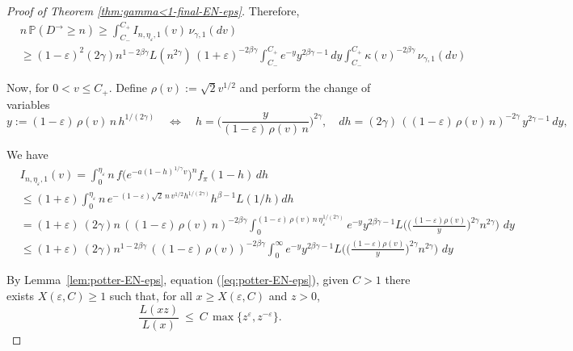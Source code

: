 \documentclass[preprint]{imsart}
\newcommand{\PP}{\mathbb{P}}
\newcommand{\1}{\mathbf{1}}
\theoremstyle{plain}
\theoremstyle{definition}
\begin{document}
\begin{proof}[Proof of Theorem \ref{thm:gamma<1-final-EN-eps}]
Therefore, 
\begin{equation}\label{lim_inf_Dn}
\begin{split}
 &n\,\PP(D^{\rightarrow}\ge n)\ge  \int_{C_{-}}^{C_{+}} I_{n,\eta_{\varepsilon},1}(v)\,\nu_{\gamma,1}(dv) \\ 
 &\geq (1-\varepsilon)^2(2\gamma)n^{1-2\beta\gamma}L(n^{2\gamma})\,(1+\varepsilon)^{-2\beta\gamma}\int_{C_{-}}^{C_{+}} e^{-y}y^{2\beta\gamma-1} \,dy\int_{C_{-}}^{C_{+}}\kappa(v)^{-2\beta\gamma}\,\nu_{\gamma,1}(dv)
\end{split}    
\end{equation}

Now, for \(0<v\leq C_{+}\). Define \(\rho(v):=\sqrt{2}v^{1/2}\) and perform the change of variables
\begin{equation*}
y:=(1-\varepsilon)\,\rho(v)\,n\,h^{1/(2\gamma)}\quad\Longleftrightarrow\quad
h=\Big(\frac{y}{(1-\varepsilon)\,\rho(v)\,n}\Big)^{2\gamma},\quad
dh=(2\gamma)\,((1-\varepsilon)\,\rho(v)\,n)^{-2\gamma}\,y^{2\gamma-1}\,dy,
\end{equation*}

We have
\begin{equation*}
    \begin{split}
        &I_{n,\eta_{\varepsilon},1}(v)=\int_{0}^{\eta_{\varepsilon}} n\, f\!\big(e^{-a(1-h)^{1/\gamma}v}\big)^{n} f_\pi(1-h)\,dh\\
        &\leq (1+\varepsilon)\int_{0}^{\eta_{\varepsilon}} n\, e^{-\,(1-\varepsilon)\sqrt{2}\,n\,v^{1/2} h^{1/(2\gamma)}}h^{\beta-1}L(1/h)dh\\
        &=(1+\varepsilon)\ (2\gamma)n\,((1-\varepsilon)\,\rho(v)\,n)^{-2\beta\gamma}\int_{0}^{(1-\varepsilon)\,\rho(v)\,n\,\eta_{\varepsilon}^{1/(2\gamma)}} e^{-y}y^{2\beta\gamma-1}L\Bigg(\Bigg(\frac{(1-\varepsilon)\rho(v)}{y}\Bigg)^{2\gamma}n^{2\gamma}\Bigg)\, \,dy\\
        &\leq (1+\varepsilon)\ (2\gamma)n^{1-2\beta\gamma}\,((1-\varepsilon)\,\rho(v))^{-2\beta\gamma}\int_{0}^{\infty} e^{-y}y^{2\beta\gamma-1}L\Bigg(\Bigg(\frac{(1-\varepsilon)\rho(v)}{y}\Bigg)^{2\gamma}n^{2\gamma}\Bigg)\, \,dy
    \end{split}
\end{equation*}

By Lemma~\ref{lem:potter-EN-eps}, equation (\ref{eq:potter-EN-eps}), given \(C>1\) there exists \(X(\varepsilon,C)\ge 1\) such that, for all \(x\ge X(\varepsilon,C)\) and \(z>0\),
\[
\frac{L(xz)}{L(x)}\ \le\ C\,\max\{z^\varepsilon,z^{-\varepsilon}\}.
\]


\end{proof}
\end{document}

